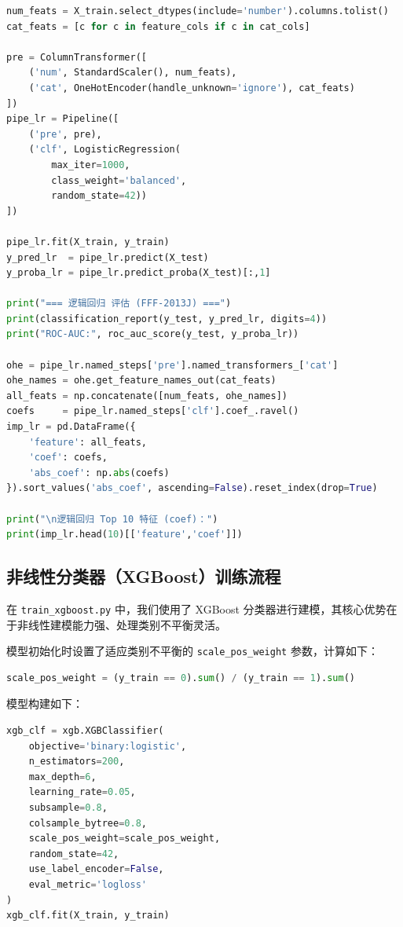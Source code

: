 \documentclass{SYSUReport}
\begin{document}
\begin{lstlisting}[language=Python]
num_feats = X_train.select_dtypes(include='number').columns.tolist()
cat_feats = [c for c in feature_cols if c in cat_cols]

pre = ColumnTransformer([
    ('num', StandardScaler(), num_feats),
    ('cat', OneHotEncoder(handle_unknown='ignore'), cat_feats)
])
pipe_lr = Pipeline([
    ('pre', pre),
    ('clf', LogisticRegression(
        max_iter=1000,
        class_weight='balanced',
        random_state=42))
])

pipe_lr.fit(X_train, y_train)
y_pred_lr  = pipe_lr.predict(X_test)
y_proba_lr = pipe_lr.predict_proba(X_test)[:,1]

print("=== 逻辑回归 评估 (FFF-2013J) ===")
print(classification_report(y_test, y_pred_lr, digits=4))
print("ROC-AUC:", roc_auc_score(y_test, y_proba_lr))

ohe = pipe_lr.named_steps['pre'].named_transformers_['cat']
ohe_names = ohe.get_feature_names_out(cat_feats)
all_feats = np.concatenate([num_feats, ohe_names])
coefs     = pipe_lr.named_steps['clf'].coef_.ravel()
imp_lr = pd.DataFrame({
    'feature': all_feats,
    'coef': coefs,
    'abs_coef': np.abs(coefs)
}).sort_values('abs_coef', ascending=False).reset_index(drop=True)

print("\n逻辑回归 Top 10 特征 (coef)：")
print(imp_lr.head(10)[['feature','coef']])
\end{lstlisting}


\subsection{非线性分类器（XGBoost）训练流程}

在 \texttt{train\_xgboost.py} 中，我们使用了 XGBoost 分类器进行建模，其核心优势在于非线性建模能力强、处理类别不平衡灵活。

模型初始化时设置了适应类别不平衡的 \texttt{scale\_pos\_weight} 参数，计算如下：

\begin{lstlisting}[language=Python]
scale_pos_weight = (y_train == 0).sum() / (y_train == 1).sum()
\end{lstlisting}

模型构建如下：

\begin{lstlisting}[language=Python]
xgb_clf = xgb.XGBClassifier(
    objective='binary:logistic',
    n_estimators=200,
    max_depth=6,
    learning_rate=0.05,
    subsample=0.8,
    colsample_bytree=0.8,
    scale_pos_weight=scale_pos_weight,
    random_state=42,
    use_label_encoder=False,
    eval_metric='logloss'
)
xgb_clf.fit(X_train, y_train)
\end{lstlisting}
\end{document}
